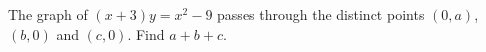 The graph of $(x+3)y=x^2-9$ passes through the distinct points $(0,a)$, $(b,0)$ and $(c,0)$. Find $a+b+c$.
